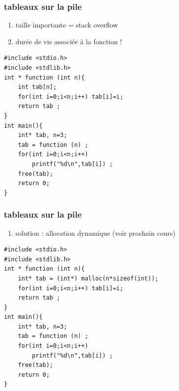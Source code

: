 \documentclass{beamer}
\begin{document}

\begin{frame}[fragile]
\frametitle{tableaux sur la pile}
\begin{enumerate}
\item taille importante = stack overflow 
\item durée de vie associée à la fonction !
\end{enumerate}
\begin{verbatim}
#include <stdio.h>
#include <stdlib.h>
int * function (int n){
    int tab[n];
    for(int i=0;i<n;i++) tab[i]=i;
    return tab ;
}
int main(){
    int* tab, n=3;
    tab = function (n) ;
    for(int i=0;i<n;i++)
        printf("%d\n",tab[i]) ;
    free(tab);
    return 0;
}
\end{verbatim}
\end{frame}


\begin{frame}[fragile]
\frametitle{tableaux sur la pile}
\begin{enumerate}
\item solution : allocation dynamique (voir prochain cours)
\end{enumerate}
\begin{verbatim}
#include <stdio.h>
#include <stdlib.h>
int * function (int n){
    int* tab = (int*) malloc(n*sizeof(int));
    for(int i=0;i<n;i++) tab[i]=i;
    return tab ;
}
int main(){
    int* tab, n=3;
    tab = function (n) ;
    for(int i=0;i<n;i++)
        printf("%d\n",tab[i]) ;
    free(tab);
    return 0;
}
\end{verbatim}
\end{frame}
\end{document}
